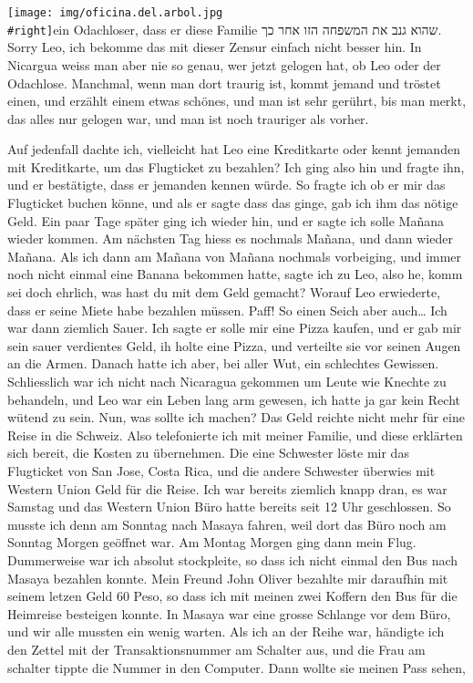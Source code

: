 \documentclass[
]{article}
\begin{document}
\texttt{[image: img/oficina.del.arbol.jpg\\\#right]}ein Odachloser, dass
er diese Familie שהוא גנב את המשפחה הזו אחר כך. Sorry Leo, ich bekomme
das mit dieser Zensur einfach nicht besser hin. In Nicargua weiss man
aber nie so genau, wer jetzt gelogen hat, ob Leo oder der Odachlose.
Manchmal, wenn man dort traurig ist, kommt jemand und tröstet einen, und
erzählt einem etwas schönes, und man ist sehr gerührt, bis man merkt,
das alles nur gelogen war, und man ist noch trauriger als vorher.

Auf jedenfall dachte ich, vielleicht hat Leo eine Kreditkarte oder kennt
jemanden mit Kreditkarte, um das Flugticket zu bezahlen? Ich ging also
hin und fragte ihn, und er bestätigte, dass er jemanden kennen würde. So
fragte ich ob er mir das Flugticket buchen könne, und als er sagte dass
das ginge, gab ich ihm das nötige Geld. Ein paar Tage später ging ich
wieder hin, und er sagte ich solle Mañana wieder kommen. Am nächsten Tag
hiess es nochmals Mañana, und dann wieder Mañana. Als ich dann am Mañana
von Mañana nochmals vorbeiging, und immer noch nicht einmal eine Banana
bekommen hatte, sagte ich zu Leo, also he, komm sei doch ehrlich, was
hast du mit dem Geld gemacht? Worauf Leo erwiederte, dass er seine Miete
habe bezahlen müssen. Paff! So einen Seich aber auch\ldots{} Ich war
dann ziemlich Sauer. Ich sagte er solle mir eine Pizza kaufen, und er
gab mir sein sauer verdientes Geld, ih holte eine Pizza, und verteilte
sie vor seinen Augen an die Armen. Danach hatte ich aber, bei aller Wut,
ein schlechtes Gewissen. Schliesslich war ich nicht nach Nicaragua
gekommen um Leute wie Knechte zu behandeln, und Leo war ein Leben lang
arm gewesen, ich hatte ja gar kein Recht wütend zu sein. Nun, was sollte
ich machen? Das Geld reichte nicht mehr für eine Reise in die Schweiz.
Also telefonierte ich mit meiner Familie, und diese erklärten sich
bereit, die Kosten zu übernehmen. Die eine Schwester löste mir das
Flugticket von San Jose, Costa Rica, und die andere Schwester überwies
mit Western Union Geld für die Reise. Ich war bereits ziemlich knapp
dran, es war Samstag und das Western Union Büro hatte bereits seit 12
Uhr geschlossen. So musste ich denn am Sonntag nach Masaya fahren, weil
dort das Büro noch am Sonntag Morgen geöffnet war. Am Montag Morgen ging
dann mein Flug. Dummerweise war ich absolut stockpleite, so dass ich
nicht einmal den Bus nach Masaya bezahlen konnte. Mein Freund John
Oliver bezahlte mir daraufhin mit seinem letzen Geld 60 Peso, so dass
ich mit meinen zwei Koffern den Bus für die Heimreise besteigen konnte.
In Masaya war eine grosse Schlange vor dem Büro, und wir alle mussten
ein wenig warten. Als ich an der Reihe war, händigte ich den Zettel mit
der Transaktionsnummer am Schalter aus, und die Frau am schalter tippte
die Nummer in den Computer. Dann wollte sie meinen Pass sehen,
\end{document}
